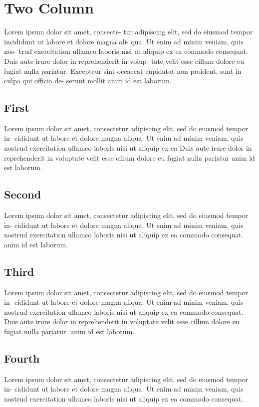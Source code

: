 


\chapter{Two Column}

\begin{multicols}{2}

Lorem ipsum dolor sit amet, consecte-
tur adipiscing elit, sed do eiusmod tempor
incididunt ut labore et dolore magna ali-
qua. Ut enim ad minim veniam, quis nos-
trud exercitation ullamco laboris nisi ut
aliquip ex ea commodo consequat. Duis
aute irure dolor in reprehenderit in volup-
tate velit esse cillum dolore eu fugiat nulla
pariatur. Excepteur sint occaecat cupidatat
non proident, sunt in culpa qui officia de-
serunt mollit anim id est laborum.
\section{First}
Lorem ipsum dolor sit amet, consectetur
adipiscing elit, sed do eiusmod tempor in-
cididunt ut labore et dolore magna aliqua.
Ut enim ad minim veniam, quis nostrud
exercitation ullamco laboris nisi ut aliquip
ex ea  Duis aute irure
dolor in reprehenderit in voluptate velit esse
cillum dolore eu fugiat nulla pariatur
anim id est laborum.
\section{Second}
Lorem ipsum dolor sit amet, consectetur
adipiscing elit, sed do eiusmod tempor in-
cididunt ut labore et dolore magna aliqua.
Ut enim ad minim veniam, quis nostrud
exercitation ullamco laboris nisi ut aliquip
ex ea commodo consequat. 
anim id est laborum.
\section{Third}
Lorem ipsum dolor sit amet, consectetur
adipiscing elit, sed do eiusmod tempor in-
cididunt ut labore et dolore magna aliqua.
Ut enim ad minim veniam, quis nostrud
exercitation ullamco laboris nisi ut aliquip
ex ea commodo consequat. Duis aute irure
dolor in reprehenderit in voluptate velit esse
cillum dolore eu fugiat nulla pariatur.
anim id est laborum.
\section{Fourth}
Lorem ipsum dolor sit amet, consectetur
adipiscing elit, sed do eiusmod tempor in-
cididunt ut labore et dolore magna aliqua.
Ut enim ad minim veniam, quis nostrud
exercitation ullamco laboris nisi ut aliquip
ex ea commodo consequat.
\end{multicols}